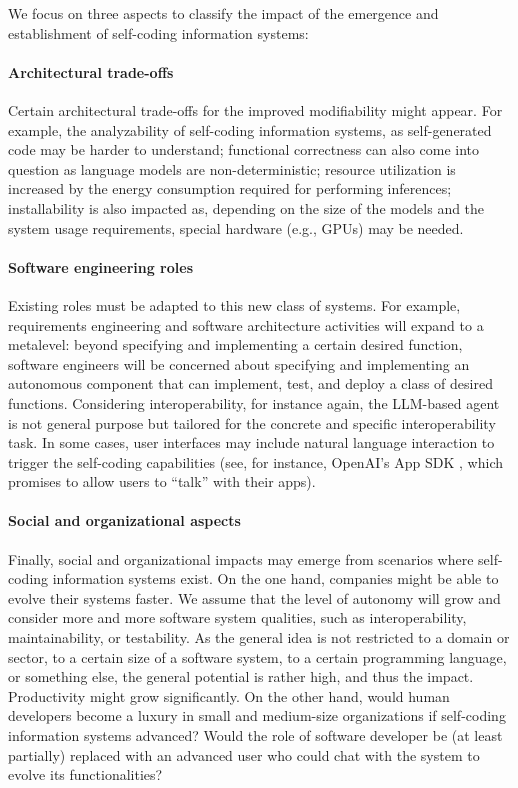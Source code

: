\documentclass[sigconf]{acmart}
\theoremstyle{definition}
\begin{document}
We focus on three aspects to classify the impact of the emergence and establishment of self-coding information systems: %

\paragraph{Architectural trade-offs} Certain architectural trade-offs for the improved modifiability might appear. For example, the analyzability of self-coding information systems, as self-generated code may be harder to understand; functional correctness can also come into question as language models are non-deterministic; resource utilization is increased by the energy consumption required for performing inferences; installability is also impacted as, depending on the size of the models and the system usage requirements, special hardware (e.g., GPUs) may be needed.

\paragraph{Software engineering roles} Existing roles must be adapted to this new class of systems. For example, requirements engineering and software architecture activities will expand to a metalevel: beyond specifying and implementing a certain desired function, software engineers will be concerned about specifying and implementing an autonomous component that can implement, test, and deploy a class of desired functions. Considering interoperability, for instance again, the LLM-based agent is not general purpose but tailored for the concrete and specific interoperability task. In some cases, user interfaces may include natural language interaction to trigger the self-coding capabilities (see, for instance, OpenAI's App SDK \cite{openai2025introducingApps}, which promises to allow users to ``talk'' with their apps).

\paragraph{Social and organizational aspects} Finally, social and organizational impacts may emerge from scenarios where self-coding information systems exist. On the one hand, companies might be able to evolve their systems faster. We assume that the level of autonomy will grow and consider more and more software system qualities, such as interoperability, maintainability, or testability. As the general idea is not restricted to a domain or sector, to a certain size of a software system, to a certain programming language, or something else, the general potential is rather high, and thus the impact. Productivity might grow significantly. On the other hand, would human developers become a luxury in small and medium-size organizations if self-coding information systems advanced? Would the role of software developer be (at least partially) replaced with an advanced user who could chat with the system to evolve its functionalities?
    
\end{document}
